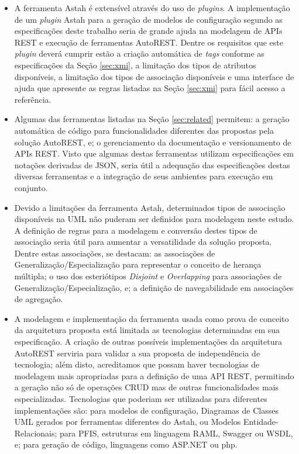 \begin{itemize}
    \item A ferramenta Astah é extensível através do uso de \textit{plugins}. A implementação de um \textit{plugin} Astah para a geração de modelos de configuração segundo as especificações deste trabalho seria de grande ajuda na modelagem de APIs REST e execução de ferramentas AutoREST. Dentre os requisitos que este \textit{plugin} deverá cumprir estão a criação automática de \textit{tags} conforme as especificações da Seção \ref{sec:xmi}, a limitação dos tipos de atributos disponíveis, a limitação dos tipos de associação disponíveis e uma interface de ajuda que apresente as regras listadas na Seção \ref{sec:xmi} para fácil acesso a referência.

    \item Algumas das ferramentas listadas na Seção \ref{sec:related} permitem: a geração automática de código para funcionalidades diferentes das propostas pela solução AutoREST, e; o gerenciamento da documentação e versionamento de APIs REST. Visto que algumas destas ferramentas utilizam especificações em notações derivadas de JSON, seria útil a adequação das especificações destas diversas ferramentas e a integração de seus ambientes para execução em conjunto.

    \item Devido a limitações da ferramenta Astah, determinados tipos de associação disponíveis na UML não puderam ser definidos para modelagem neste estudo. A definição de regras para a modelagem e conversão destes tipos de associação seria útil para aumentar a versatilidade da solução proposta. Dentre estas associações, se destacam: as associações de Generalização/Especialização para representar o conceito de herança múltipla; o uso dos esteriótipos \textit{Disjoint} e \textit{Overlapping} para associações de Generalização/Especialização, e; a definição de navegabilidade em associações de agregação.

    \item A modelagem e implementação da ferramenta usada como prova de conceito da arquitetura proposta está limitada as tecnologias determinadas em sua especificação. A criação de outras possíveis implementações da arquitetura AutoREST serviria para validar a sua proposta de independência de tecnologia; além disto, acreditamos que possam haver tecnologias de modelagem mais apropriadas para a definição de uma API REST, permitindo a geração não só de operações CRUD mas de outras funcionalidades mais especializadas. Tecnologias que poderiam ser utilizadas para diferentes implementações são: para modelos de configuração, Diagramas de Classes UML gerados por ferramentas diferentes do Astah, ou Modelos Entidade-Relacionais; para PFIS, estruturas em linguagem RAML, Swagger ou WSDL, e; para geração de código, linguagens como ASP.NET ou php.
\end{itemize}
